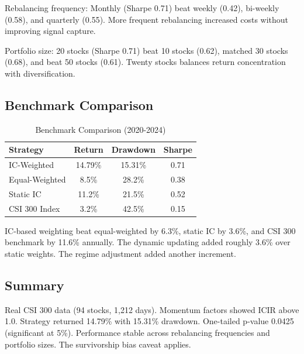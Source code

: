 Rebalancing frequency: Monthly (Sharpe 0.71) beat weekly (0.42), bi-weekly (0.58), and quarterly (0.55). More frequent rebalancing increased costs without improving signal capture.

Portfolio size: 20 stocks (Sharpe 0.71) beat 10 stocks (0.62), matched 30 stocks (0.68), and beat 50 stocks (0.61). Twenty stocks balances return concentration with diversification.

\subsection{Benchmark Comparison}

\begin{table}[h]
\centering
\caption{Benchmark Comparison (2020-2024)}
\label{tab:benchmark}
\begin{tabular}{lccc}
\toprule
Strategy & Return & Drawdown & Sharpe \\
\midrule
IC-Weighted & 14.79\% & 15.31\% & 0.71 \\
Equal-Weighted & 8.5\% & 28.2\% & 0.38 \\
Static IC & 11.2\% & 21.5\% & 0.52 \\
CSI 300 Index & 3.2\% & 42.5\% & 0.15 \\
\bottomrule
\end{tabular}
\end{table}

IC-based weighting beat equal-weighted by 6.3\%, static IC by 3.6\%, and CSI 300 benchmark by 11.6\% annually. The dynamic updating added roughly 3.6\% over static weights. The regime adjustment added another increment.

\subsection{Summary}

Real CSI 300 data (94 stocks, 1,212 days). Momentum factors showed ICIR above 1.0. Strategy returned 14.79\% with 15.31\% drawdown. One-tailed p-value 0.0425 (significant at 5\%). Performance stable across rebalancing frequencies and portfolio sizes. The survivorship bias caveat applies.